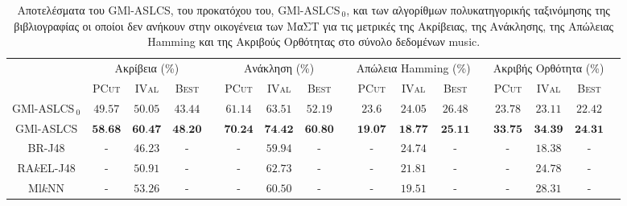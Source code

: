 \begin{landscape}
\begin{table}
\begin{center}
\caption[Αποτελέσματα στο σύνολο δεδομένων music.]{Αποτελέσματα του GMl-ASLCS, του προκατόχου του, GMl-ASLCS$_{\:0}$, και των αλγορίθμων πολυκατηγορικής ταξινόμησης της βιβλιογραφίας οι οποίοι δεν ανήκουν στην οικογένεια των ΜαΣΤ για τις μετρικές της Ακρίβειας, της Ανάκλησης, της Απώλειας Hamming και της Ακριβούς Ορθότητας στο σύνολο δεδομένων music.}
\label{table:musicEvals}
\begin{tabular}{ccccccccccccccccc}
 & \multicolumn{3}{c}{Ακρίβεια (\%)} & & \multicolumn{3}{c}{Ανάκληση (\%)} & & \multicolumn{3}{c}{Απώλεια Hamming (\%)} & & \multicolumn{3}{c}{Ακριβής Ορθότητα (\%)}
\\ 
\cline{2-4} \cline{6-8} \cline{10-12} \cline{14-16}
& \textsc{PCut} & \textsc{IVal} & \textsc{Best} & & \textsc{PCut} & \textsc{IVal} & \textsc{Best} & & \textsc{PCut} & \textsc{IVal} & \textsc{Best} & & \textsc{PCut} & \textsc{IVal} & \textsc{Best}\\ \hline
GMl-ASLCS$_{\:0}$ & $49.57$ & $50.05$ & $43.44$ & & $61.14$ & $63.51$ & $52.19$ & & $23.6$ & $24.05$ & $26.48$ & & $23.78$ & $23.11$ & $22.42$ \\ 
GMl-ASLCS 		  & $\textbf{58.68}$ & $\textbf{60.47}$ & $\textbf{48.20}$ & & $\textbf{70.24}$ & $\textbf{74.42}$ & $\textbf{60.80}$ & & $\textbf{19.07}$	& $\textbf{18.77}$ & $\textbf{25.11}$	& & $\textbf{33.75}$ & $\textbf{34.39}$	& $\textbf{24.31}$ \\
\hline
\hline
BR-J48 			  & - & $46.23$ & - & & - & $59.94$ & - & & -	& $24.74$ & -	& & - & $18.38$	& - \\
RA$k$EL-J48 	  & - & $50.91$ & - & & - & $62.73$ & - & & -	& $21.81$ & -	& & - & $24.78$	& - \\
Ml$k$NN 		  & - & $53.26$ & - & & - & $60.50$ & - & & -	& $19.51$ & -	& & - & $28.31$	& - \\
\hline

\end{tabular} 
\end{center}
\end{table}



\end{landscape}
